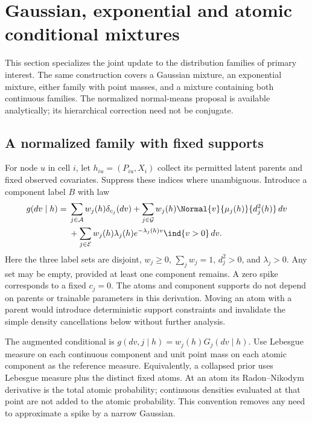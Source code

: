 \section{Gaussian, exponential and atomic conditional mixtures}
\label{sec:mixturefamilies}
This section specializes the joint update to the distribution families of
primary interest. The same construction covers a Gaussian mixture, an
exponential mixture, either family with point masses, and a mixture containing
both continuous families. The normalized normal-means proposal is available
analytically; its hierarchical correction need not be conjugate.

\subsection{A normalized family with fixed supports}
For node \(u\) in cell \(i\), let \(h_{iu}=(P_{iu},X_i)\) collect its
permitted latent parents and fixed observed covariates. Suppress these
indices where unambiguous. Introduce a component label \(B\) with law
\begin{equation}\label{eq:familyprior}
\begin{split}
g(dv\mid h)={}&
\sum_{j\in\mathcal A}w_j(h)\delta_{c_j}(dv)
+\sum_{j\in\mathcal G}w_j(h)\Normal{v}{\mu_j(h)}{d_j^2(h)}\,dv\\
&+\sum_{j\in\mathcal E}w_j(h)\lambda_j(h)
             e^{-\lambda_j(h)v}\ind\{v>0\}\,dv .
\end{split}
\end{equation}
Here the three label sets are disjoint, \(w_j\geq0\), \(\sum_jw_j=1\),
\(d_j^2>0\), and \(\lambda_j>0\). Any set may be empty, provided at least
one component remains. A zero spike corresponds to a fixed \(c_j=0\).
The atoms and component supports do not depend on parents or trainable
parameters in this derivation. Moving an atom with a parent would introduce
deterministic support constraints and invalidate the simple density
cancellations below without further analysis.

The augmented conditional is \(g(dv,j\mid h)=w_j(h)G_j(dv\mid h)\).
Use Lebesgue measure on each continuous component and unit point mass on
each atomic component as the reference measure. Equivalently, a collapsed
prior uses Lebesgue measure plus the distinct fixed atoms. At an atom its
Radon--Nikodym derivative is the total atomic probability; continuous
densities evaluated at that point are not added to the atomic probability.
This convention removes any need to approximate a spike by a narrow Gaussian.

